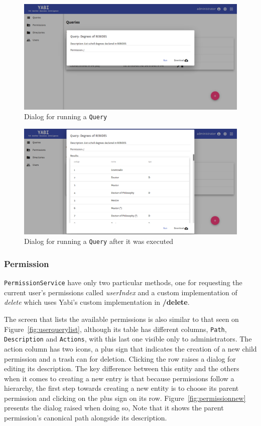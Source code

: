 \begin{figure}
  \centering
  \includegraphics[width=.8\textwidth]{images/screenshots/query/query-pre-run}
  \caption{Dialog for running a \texttt{Query}}\label{fig:queryprerun}
\end{figure}

\begin{figure}
  \centering
  \includegraphics[width=.8\textwidth]{images/screenshots/query/query-post-run}
  \caption{Dialog for running a \texttt{Query} after it was executed}\label{fig:querypostrun}
\end{figure}


\subsubsection{Permission}
\texttt{PermissionService} have only two particular methods, one for requesting the current user's permissions called \textit{userIndex} and a custom implementation of \textit{delete} which uses \gls{Yabi}'s custom implementation in \textbf{/delete}.

The screen that lists the available permissions is also similar to that seen on Figure~\ref{fig:userquerylist}, although its table has different columns, \texttt{Path}, \texttt{Description} and \texttt{Actions}, with this last one visible only to administrators. The action column has two icons, a plus sign that indicates the creation of a new child permission and a trash can for deletion. Clicking the row raises a dialog for editing its description. The key difference between this entity and the others when it comes to creating a new entry is that because permissions follow a hierarchy, the first step towards creating a new entity is to choose its parent permission and clicking on the plus sign on its row. Figure~\ref{fig:permissionnew} presents the dialog raised when doing so, Note that it shows the parent permission's canonical path alongside its description.

